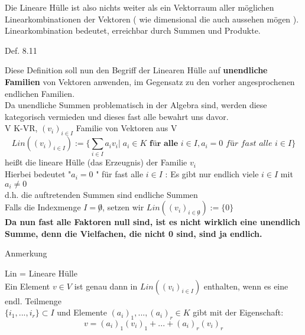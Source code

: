 \documentclass[headsepline,12pt,a4paper]{scrartcl}
\begin{document}
Die Lineare Hülle ist also nichts weiter als ein Vektorraum aller möglichen Linearkombinationen der Vektoren ( wie dimensional die auch aussehen mögen ). Linearkombination bedeutet, erreichbar durch Summen und Produkte. 

\item[Def. 8.11]

Diese Definition soll nun den Begriff der Linearen Hülle auf \textbf{unendliche Familien} von Vektoren anwenden, im Gegensatz zu den vorher angesprochenen endlichen Familien. \\

Da unendliche Summen problematisch in der Algebra sind, werden diese kategorisch vermieden und dieses fast alle bewahrt uns davor. \\

V K-VR, $(v_i)_{i \in I}$ Familie von Vektoren aus V \\

$$\textit{Lin}((v_i)_{i \in I}) := \{\sum_{i \in I} a_i v_i | \; a_i \in K \textbf{ für alle } i \in I, a_i = 0 \textit{ für fast alle } i \in I  \}$$
heißt die lineare Hülle (das Erzeugnis) der Familie $v_i$ \\

Hierbei bedeutet "$a_i = 0$ " für fast alle $i\in I$ : Es gibt nur endlich viele $i \in I $ mit $a_i \neq 0$ \\

d.h. die auftretenden Summen sind endliche Summen \\

Falls die Indexmenge $I = \not 0 $, setzen wir $\textit{Lin}((v_i)_{i \in \not 0}):= \{0\}$ \\

\textbf{Da nun fast alle Faktoren null sind, ist es nicht wirklich eine unendlich Summe, denn die Vielfachen, die nicht 0 sind, sind ja endlich.}

\newpage

\item[Anmerkung]

Lin = Lineare Hülle \\

Ein Element $ v\in V$ ist genau dann in $\textit{Lin}((v_i)_{i \in I})$ enthalten, wenn es eine endl. Teilmenge \\
$\{i_1,...,i_r\} \subset I $  und Elemente $(a_{i})_1,...,(a_{i})_r \in K $ gibt mit der Eigenschaft: \\

$$ v = (a_{i})_1 (v_{i})_1 + ... + (a_{i})_r (v_{i})_r $$
\end{document}
